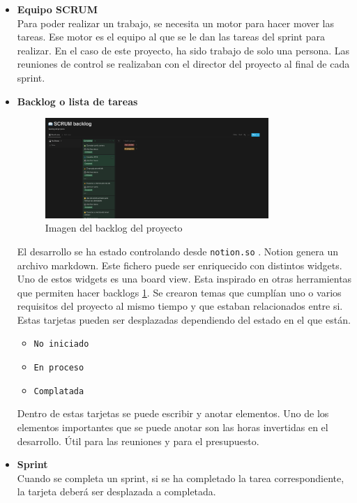 \begin{itemize}
    \item \textbf{Equipo SCRUM}\\
    Para poder realizar un trabajo, se necesita un motor para hacer mover las tareas. Ese motor es el equipo al que se le dan las tareas del sprint para realizar.
    En el caso de este proyecto, ha sido trabajo de solo una persona. Las reuniones de control se realizaban con el director del proyecto al final de cada sprint.
    \item \textbf{Backlog o lista de tareas}\\
    \begin{figure}[h!]
        \centering
        \includegraphics[width=0.8\textwidth]{Figures/Screenshot_20220601_182542.png}
        \caption{Imagen del backlog del proyecto}
        \label{fg:backlog}
    \end{figure}
    El desarrollo se ha estado controlando desde \verb|notion.so| \cite{web:notion}. Notion genera un archivo markdown. Este fichero puede ser enriquecido con distintos widgets. Uno de estos widgets es una board view.  Esta inspirado en otras herramientas que permiten hacer backlogs \ref{fg:backlog}.
    Se crearon temas que cumplían uno o varios requisitos del proyecto al mismo tiempo y que estaban relacionados entre si. Estas tarjetas pueden ser desplazadas dependiendo del estado en el que están.
    \begin{itemize}
        \item \verb|No iniciado|
        \item \verb|En proceso|
        \item \verb|Complatada|
    \end{itemize}
    Dentro de estas tarjetas se puede escribir y anotar elementos. Uno de los elementos importantes que se puede anotar son las horas invertidas en el desarrollo. Útil para las reuniones y para el presupuesto.
    \item \textbf{Sprint}\\
    Cuando se completa un sprint, si se ha completado la tarea correspondiente, la tarjeta deberá ser desplazada a completada.

\end{itemize}

